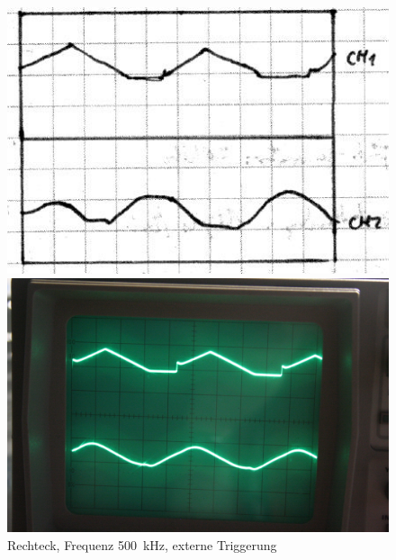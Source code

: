 \begin{figure}[htbp]
	\centering
	\begin{minipage}{.45\linewidth}
	\includegraphics[width=\linewidth]{Skizzen/IMG_0779-1500.jpg}
	\end{minipage}
	\hfill
	\begin{minipage}{.45\linewidth}
	\includegraphics[width=\linewidth]{Fotos/IMG_0779-1500.jpg}
	\end{minipage}
	\caption{%
		Rechteck, Frequenz \SI{500}{\kilo\hertz},
		externe Triggerung
	}
	\label{fig:0779}
\end{figure}

\IfFileExists{\bibliographyfile}{
	
}{}



